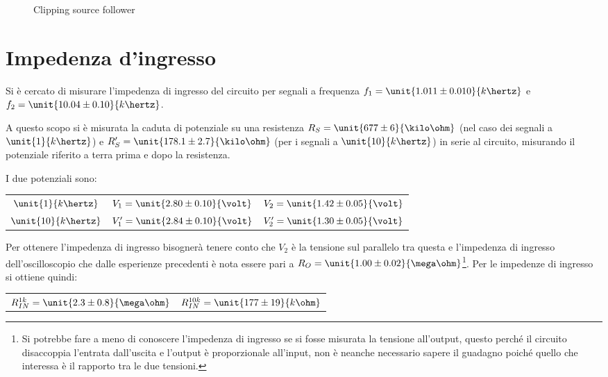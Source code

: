 \documentclass[10pt,a4paper]{article}
\begin{document}
\begin{figure}[h!]
\begin{minipage}{0.49\textwidth}
		\caption{Clipping source follower}	
			\label{fig:clippingbasso}	
	\end{minipage}
\end{figure}
\pagebreak
\section{Impedenza d'ingresso}                                                                                                                                 
Si è cercato di misurare l'impedenza di ingresso del circuito per segnali a frequenza
$f_1 = \unit{1.011 \pm 0.010}{k\hertz}$ e $f_2= \unit{10.04 \pm 0.10}{k\hertz}$.

A questo scopo si è misurata la caduta di potenziale su una resistenza $R_S = \unit{677 \pm 6}{\kilo\ohm}$ (nel caso dei segnali a $\unit{1}{k\hertz}$) e $R_S' = \unit{178.1 \pm 2.7}{\kilo\ohm}$ (per i segnali a $\unit{10}{k\hertz}$) in serie al circuito, misurando il potenziale riferito a terra prima e dopo la resistenza.

I due potenziali sono:
\begin{table}[h!]
	\centering
	\begin{tabular}{c|cc}
		$\unit{1}{k\hertz}$ & $V_1 = \unit{2.80 \pm 0.10}{\volt}$  & $V_2 = \unit{1.42 \pm 0.05}{\volt}$\\
		$\unit{10}{k\hertz}$ & $V'_1 = \unit{2.84 \pm 0.10}{\volt}$  & $V'_2 = \unit{1.30 \pm 0.05}{\volt}$
	\end{tabular}
\end{table}

Per ottenere l'impedenza di ingresso bisognerà tenere conto che $V_2$ è la tensione sul parallelo tra questa e l'impedenza di ingresso dell'oscilloscopio che dalle esperienze precedenti è nota essere pari a $R_O=\unit{1.00 \pm 0.02}{\mega\ohm}$\footnote{Si potrebbe fare a meno di conoscere l'impedenza di ingresso se si fosse misurata la tensione all'output, questo perché il circuito disaccoppia l'entrata dall'uscita e l'output è proporzionale all'input, non è neanche necessario sapere il guadagno poiché quello che interessa è il rapporto tra le due tensioni.}. Per le impedenze di ingresso si ottiene quindi:
\begin{table}[h!]
	\centering
	\begin{tabular}{cc}
	$R_{IN}^{1k} = \unit{2.3 \pm 0.8}{\mega\ohm}$ & $R_{IN}^{10k} = \unit{177 \pm 19}{k\ohm}$
	\end{tabular}
\end{table}
\end{document}
